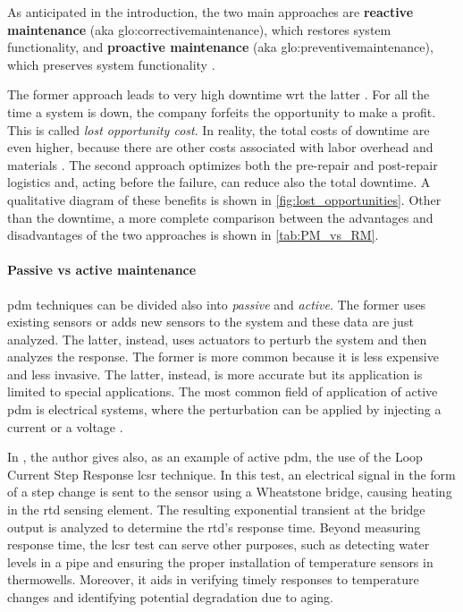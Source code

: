 As anticipated in the introduction, the two main approaches are \textbf{reactive maintenance} (\gls{aka} \gls{glo:correctivemaintenance}), which restores system functionality, and \textbf{proactive maintenance} (\gls{aka} \gls{glo:preventivemaintenance}), which preserves system functionality \cite{Rely_maint_book}.

The former approach leads to very high downtime \gls{wrt} the latter \cite{NIST}. For all the time a system is down, the company forfeits the opportunity to make a profit. This is called \emph{lost opportunity cost}. In reality, the total costs of downtime are even higher, because there are other costs associated with labor overhead and materials \cite{Lost_Opport_Cost}. The second approach optimizes both the pre-repair and post-repair logistics and, acting before the failure, can reduce also the total downtime. A qualitative diagram of these benefits is shown in \autoref{fig:lost_opportunities}. Other than the downtime, a more complete comparison between the advantages and disadvantages of the two approaches is shown in \autoref{tab:PM_vs_RM}.



\paragraph{Passive vs active maintenance}
\gls{pdm} techniques can be divided also into \emph{passive} and \emph{active}. The former uses existing sensors or adds new sensors to the system and these data are just analyzed. The latter, instead, uses actuators to perturb the system and then analyzes the response. The former is more common because it is less expensive and less invasive. The latter, instead, is more accurate but its application is limited to special applications. The most common field of application of active \gls{pdm} is electrical systems, where the perturbation can be applied by injecting a current or a voltage \cite{State_Art_Hasemian_2011}.

In \cite{State_Art_Hasemian_2011}, the author gives also, as an example of active \gls{pdm}, the use of the Loop Current Step Response \gls{lcsr} technique. In this test, an electrical signal in the form of a step change is sent to the sensor using a Wheatstone bridge, causing heating in the \gls{rtd} sensing element. The resulting exponential transient at the bridge output is analyzed to determine the \gls{rtd}'s response time. Beyond measuring response time, the \gls{lcsr} test can serve other purposes, such as detecting water levels in a pipe and ensuring the proper installation of temperature sensors in thermowells. Moreover, it aids in verifying timely responses to temperature changes and identifying potential degradation due to aging.

